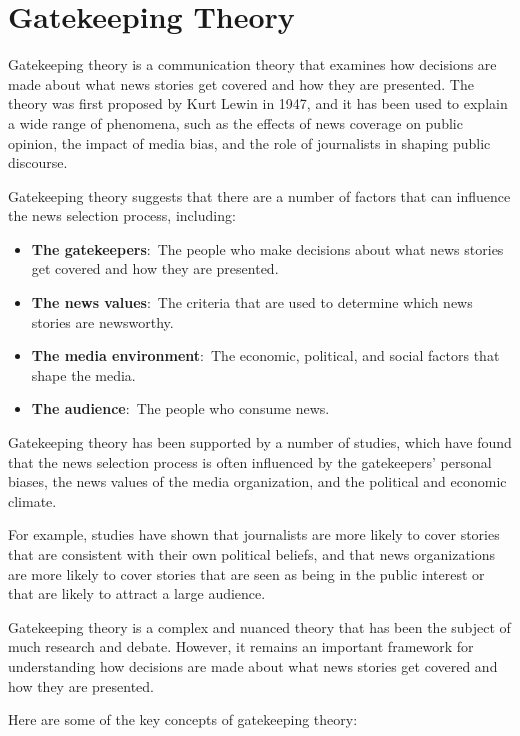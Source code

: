 \documentclass[
]{book}
\begin{document}
\section{Gatekeeping Theory}\label{gatekeeping-theory}

Gatekeeping theory is a communication theory that examines how decisions are made about what news stories get covered and how they are presented. The theory was first proposed by Kurt Lewin in 1947, and it has been used to explain a wide range of phenomena, such as the effects of news coverage on public opinion, the impact of media bias, and the role of journalists in shaping public discourse.

Gatekeeping theory suggests that there are a number of factors that can influence the news selection process, including:

\begin{itemize}
\item
  \textbf{The gatekeepers}:~The people who make decisions about what news stories get covered and how they are presented.
\item
  \textbf{The news values}:~The criteria that are used to determine which news stories are newsworthy.
\item
  \textbf{The media environment}:~The economic, political, and social factors that shape the media.
\item
  \textbf{The audience}:~The people who consume news.
\end{itemize}

Gatekeeping theory has been supported by a number of studies, which have found that the news selection process is often influenced by the gatekeepers' personal biases, the news values of the media organization, and the political and economic climate.

For example, studies have shown that journalists are more likely to cover stories that are consistent with their own political beliefs, and that news organizations are more likely to cover stories that are seen as being in the public interest or that are likely to attract a large audience.

Gatekeeping theory is a complex and nuanced theory that has been the subject of much research and debate. However, it remains an important framework for understanding how decisions are made about what news stories get covered and how they are presented.

Here are some of the key concepts of gatekeeping theory:
\end{document}
